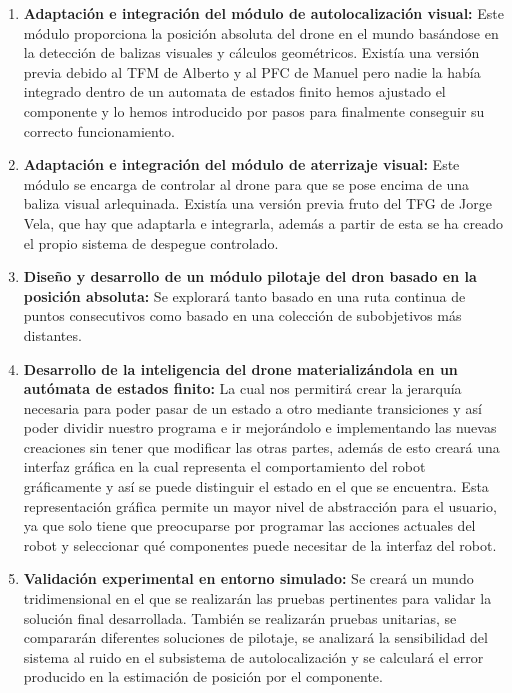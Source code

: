 \begin{enumerate}
	\item{\textbf{Adaptación e integración del módulo de autolocalización visual:} Este módulo proporciona la posición absoluta del drone en el mundo basándose en la detección de balizas visuales y cálculos geométricos. Existía una versión previa debido al TFM de Alberto y al PFC de Manuel pero nadie la había integrado dentro de un automata de estados finito hemos ajustado el componente y lo hemos introducido por pasos para finalmente conseguir su correcto funcionamiento.}
	\item{\textbf{Adaptación e integración del módulo de aterrizaje visual:} Este módulo se encarga de controlar al drone para que se pose encima de una baliza visual arlequinada. Existía una versión previa fruto del TFG de Jorge Vela, que hay que adaptarla e integrarla, además a partir de esta se ha creado el propio sistema de despegue controlado.}
	\item{\textbf{Diseño y desarrollo de un módulo pilotaje del dron basado en la posición absoluta:} Se explorará tanto basado en una ruta continua de puntos consecutivos como basado en una colección de subobjetivos más distantes.}
	\item{\textbf{Desarrollo de la inteligencia del drone materializándola en un autómata de estados finito:} La cual nos permitirá crear la jerarquía necesaria para poder pasar de un estado a otro mediante transiciones y así poder dividir nuestro programa e ir mejorándolo e implementando las nuevas creaciones sin tener que modificar las otras partes, además de esto creará una interfaz gráfica en la cual representa el comportamiento del robot gráficamente y así se puede distinguir el estado en el que se encuentra. Esta representación gráfica permite un mayor nivel de abstracción para el usuario, ya que solo tiene que preocuparse por programar las acciones actuales del robot y seleccionar qué componentes puede necesitar de la interfaz del robot.}
	\item{\textbf{Validación experimental en entorno simulado:} Se creará un mundo tridimensional en el que se realizarán las pruebas pertinentes para validar la solución final desarrollada. También se realizarán pruebas unitarias, se compararán diferentes soluciones de pilotaje, se analizará la sensibilidad del sistema al ruido en el subsistema de autolocalización y se calculará el error producido en la estimación de posición por el componente.}
\end{enumerate}

